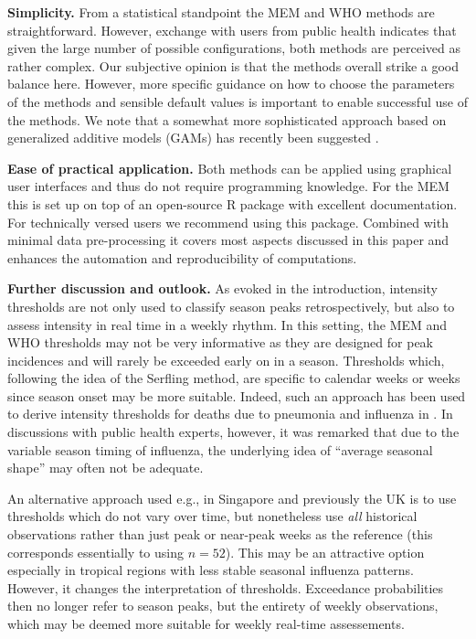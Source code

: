 \documentclass[12pt]{article}
\begin{document}
\begin{description}
\item \textbf{Simplicity.} From a statistical standpoint the MEM and WHO methods are straightforward. However, exchange with users from public health indicates that given the large number of possible configurations, both methods are perceived as rather complex. Our subjective opinion is that the methods overall strike a good balance here. However, more specific guidance on how to choose the parameters of the methods and sensible default values is important to enable successful use of the methods. We note that a somewhat more sophisticated approach based on generalized additive models (GAMs) has recently been suggested \citep{Pang2023}.
\item \textbf{Ease of practical application.} Both methods can be applied using graphical user interfaces and thus do not require programming knowledge. For the MEM this is set up on top of an open-source R package with excellent documentation. For technically versed users we recommend using this package. Combined with minimal data pre-processing it covers most aspects discussed in this paper and enhances the automation and reproducibility of computations.
\end{description}

\noindent \textbf{Further discussion and outlook.} As evoked in the introduction, intensity thresholds are not only used to classify season peaks retrospectively, but also to assess intensity in real time in a weekly rhythm. In this setting, the MEM and WHO thresholds may not be very informative as they are designed for peak incidences and will rarely be exceeded early on in a season. Thresholds which, following the idea of the Serfling method, are specific to calendar weeks or weeks since season onset may be more suitable. Indeed, such an approach has been used to derive intensity thresholds for deaths due to pneumonia and influenza in \cite{Biggerstaff2017}. In discussions with public health experts, however, it was remarked that due to the variable season timing of influenza, the underlying idea of ``average seasonal shape'' may often not be adequate.

An alternative approach used e.g., in Singapore \citep{Pung2020} and previously the UK \citep{Green2015} is to use thresholds which do not vary over time, but nonetheless use \textit{all} historical observations rather than just peak or near-peak weeks as the reference (this corresponds essentially to using $n = 52$). This may be an attractive option especially in tropical regions with less stable seasonal influenza patterns. However, it changes the interpretation of thresholds. Exceedance probabilities then no longer refer to season peaks, but the entirety of weekly observations, which may be deemed more suitable for weekly real-time assessements.
\end{document}
